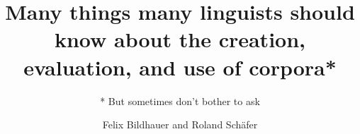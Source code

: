 \title{Many things many linguists should know about the creation, evaluation, and use of corpora*}
\subtitle{* But sometimes don’t bother to ask}
\dedication{In memory of Adam Kilgarriff}
\author{Felix Bildhauer and Roland Schäfer}
\renewcommand{\lsISBNdigital}{000-0-000000-00-0}
\renewcommand{\lsISBNhardcover}{000-0-000000-00-0}
\renewcommand{\lsISBNsoftcover}{000-0-000000-00-0}
\renewcommand{\lsISBNsoftcoverus}{000-0-000000-00-0}
\renewcommand{\lsSeries}{tbls}
\renewcommand{\lsSeriesNumber}{99}
  
